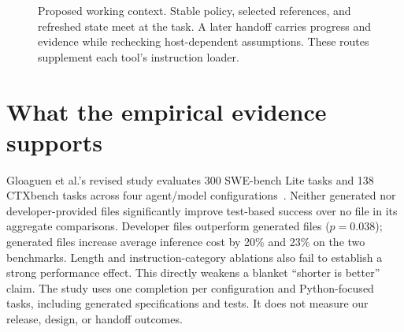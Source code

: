 \documentclass[10pt,letterpaper,twocolumn]{article}
\begin{document}
\begin{figure}[t]
\centering
{}
\caption{Proposed working context. Stable policy, selected references, and refreshed state meet at the task. A later handoff carries progress and evidence while rechecking host-dependent assumptions. These routes supplement each tool's instruction loader.}
\label{fig:routes}
\end{figure}

\section{What the empirical evidence supports}
Gloaguen et al.'s revised study evaluates 300 SWE-bench Lite tasks and 138 CTXbench tasks across four agent/model configurations~\cite{gloaguen}. Neither generated nor developer-provided files significantly improve test-based success over no file in its aggregate comparisons. Developer files outperform generated files ($p=0.038$); generated files increase average inference cost by 20\% and 23\% on the two benchmarks. Length and instruction-category ablations also fail to establish a strong performance effect. This directly weakens a blanket ``shorter is better'' claim. The study uses one completion per configuration and Python-focused tasks, including generated specifications and tests. It does not measure our release, design, or handoff outcomes.
\end{document}
